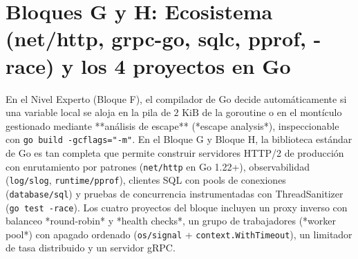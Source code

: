 \documentclass{book}
\begin{document}
\section{Bloques G y H: Ecosistema (net/http, grpc-go, sqlc, pprof, -race) y los 4 proyectos en Go}

En el Nivel Experto (Bloque F), el compilador de Go decide automáticamente si una variable local se aloja en la pila de \(2\text{ KiB}\) de la goroutine o en el montículo gestionado mediante **análisis de escape** (*escape analysis*), inspeccionable con \texttt{go build -gcflags="-m"}. En el Bloque G y Bloque H, la biblioteca estándar de Go es tan completa que permite construir servidores HTTP/2 de producción con enrutamiento por patrones (\texttt{net/http} en Go 1.22+), observabilidad (\texttt{log/slog}, \texttt{runtime/pprof}), clientes SQL con pools de conexiones (\texttt{database/sql}) y pruebas de concurrencia instrumentadas con ThreadSanitizer (\texttt{go test -race}). Los cuatro proyectos del bloque incluyen un proxy inverso con balanceo *round-robin* y *health checks*, un grupo de trabajadores (*worker pool*) con apagado ordenado (\texttt{os/signal} + \texttt{context.WithTimeout}), un limitador de tasa distribuido y un servidor gRPC.
\end{document}
